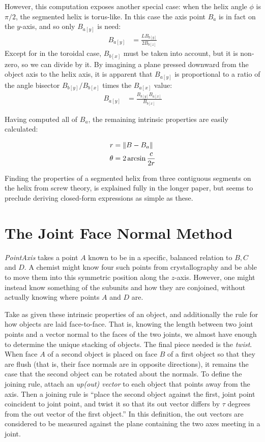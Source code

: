 \documentclass{svproc}
\DeclarePairedDelimiter{\norm}{\lVert}{\rVert}
\begin{document}
However, this computation exposes another special case: when the
helix angle $\phi$ is $\pi /2$, the segmented helix is
torus-like. In this case the axis point $B_a$ is in fact
on the $y$-axis, and so only $B_{a[y]}$ is need:
\begin{align}
  B_{a[y]} &=  \frac{L B_{b[y]}}{2 B_{b[z]}}
\end{align}
Except for in the toroidal case,  $B_{b[x]}$ must be taken into
account, but it is non-zero, so we can divide by it.
By imagining a plane pressed downward from the
object axis to the helix axis, it is apparent that $B_{a[y]}$
is proportional to a ratio of the angle bisector
$B_{b[y]}/B_{b[x]}$ times the $B_{a[x]}$ value:
\begin{align}
  B_{a[y]} &=  \frac{ B_{b[y]} B_{a[x]}}{ B_{b[x]}}
\end{align}

Having computed all of $B_a$, the remaining intrinsic properties are easily
calculated:

\begin{align}
  r &= \norm{B - B_a}  \\
  \theta &= 2 \arcsin{\frac{c}{2r}}
\end{align}

Finding the properties of a segmented helix from three contiguous segments
on the helix from screw theory\cite{wittenburg2016kinematics,kahn1989defining},
is explained fully in the longer paper\cite{readfullsegmentedhelix}, but seems to preclude deriving closed-form expressions as simple as these.


\section{The Joint Face Normal Method}
\label{sec:facenormal}

{\em PointAxis} takes a point $A$ known to be in a specific, balanced relation
to $B, C$ and $D$. A chemist might know four such points from crystallography
and be able to move them into this symmetric position along the $z$-axis.
However, one might instead know something of the subunits and
how they are conjoined, without actually knowing where points $A$
and $D$ are.

Take as given these intrinsic properties of an object, and additionally the
rule for how objects are laid face-to-face. That is, knowing the length between two
joint points and a vector normal to the faces of the two joints, we almost have
enough to determine the unique stacking of objects. The final piece
needed is
the {\em twist}. When face $A$ of a second object is placed on face $B$
of a first object so that they are flush (that is, their face normals are in opposite directions),
it remains the case that the second object can be rotated about the normals. To
define the joining rule, attach an {\em up(out) vector} to each object that points away from the axis.
Then a joining
rule is ``place the second object against the first, joint point coincident to joint point,
and twist it so that its out vector differs by $\tau$ degrees from the out vector of the first
object.'' In this definition, the out vectors are considered to be measured against the plane
containing the two axes meeting in a joint.
\end{document}
